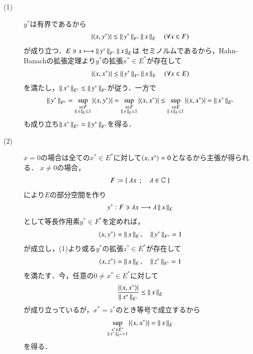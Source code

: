 	\begin{prf}\mbox{}
		\begin{description}
			\item[(1)]
				$y^*$は有界であるから
				\begin{align}
					\left| \inprod<x,y^*> \right| \leq \Norm{y^*}{F^*} \Norm{x}{E} \quad (\forall x \in F)
				\end{align}
				が成り立つ．$E \ni x \longmapsto \left\|\, y^*\, \right\|_{F^*} \left\|\, x\, \right\|_{E}$は
				セミノルムであるから，Hahn-Banachの拡張定理より$y^*$の拡張$x^* \in E^*$が存在して
				\begin{align}
					\left| \inprod<x,x^*> \right| \leq \Norm{y^*}{F^*} \Norm{x}{E} \quad (\forall x \in E)
				\end{align}
				を満たし，$\left\|\, x^*\, \right\|_{E^*} \leq \left\|\, y^*\, \right\|_{F^*}$が従う．一方で
				\begin{align}
					\Norm{y^*}{F^*} = \sup{\substack{x \in F \\ \Norm{x}{E} \leq 1}}{\left| \inprod<x,y^*> \right|}
					= \sup{\substack{x \in F \\ \Norm{x}{E} \leq 1}}{\left| \inprod<x,x^*> \right|}
					\leq \sup{\substack{x \in E \\ \Norm{x}{E} \leq 1}}{\left| \inprod<x,x^*> \right|}
					= \Norm{x^*}{E^*}
				\end{align}
				も成り立ち$\left\|\, x^*\, \right\|_{E^*} = \left\|\, y^*\, \right\|_{F^*}$を得る．
			
			\item[(2)]
				$x = 0$の場合は全ての$x^* \in E^*$に対して$\inprod<x,x^*> = 0$となるから主張が得られる．
				$x \neq 0$の場合，
				\begin{align}
					F \coloneqq \left\{\ \lambda x\ \, ; \quad \lambda \in \mathbb{C}\ \right\}
				\end{align}
				により$E$の部分空間を作り
				\begin{align}
					y^*:F \ni \lambda x \longrightarrow \lambda \left\|\, x\, \right\|_{E}
				\end{align}
				として等長作用素$y^* \in F^*$を定めれば，
				\begin{align}
					\inprod<x,y^*> = \Norm{x}{E},
					\quad \Norm{y^*}{F^*} = 1
				\end{align}
				が成立し，(1)より或る$y^*$の拡張$z^* \in E^*$が存在して
				\begin{align}
					\inprod<x,z^*> = \Norm{x}{E},
					\quad \Norm{z^*}{E^*} = 1
				\end{align}
				を満たす．今，任意の$0 \neq x^* \in E^*$に対して
				\begin{align}
					\frac{\left| \inprod<x,x^*> \right|}{\Norm{x^*}{E^*}} \leq \Norm{x}{E}
				\end{align}
				が成り立っているが，$x^* = z^*$のとき等号で成立するから
				\begin{align}
					\sup{\substack{x^* \in E^* \\ \Norm{x^*}{E^*} = 1}}{\left| \inprod<x,x^*> \right|} = \Norm{x}{E}
				\end{align}
				を得る．
				\QED
		\end{description}
	\end{prf}
	
